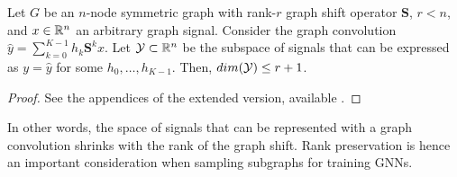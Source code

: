 \begin{proposition}
Let $G$ be an $n$-node symmetric graph with rank-$r$ graph shift operator $\mathbf{S}$, $r < n$, and $x \in {\mathbb R}^n$ an arbitrary graph signal. Consider the graph convolution $\hat{y} = \sum_{k=0}^{K-1}h_k\mathbf{S}^kx$. Let ${\mathcal Y} \subset {\mathbb R}^n$ be the subspace of signals that can be expressed as $y=\hat{y}$ for some $h_0, \ldots, h_{K-1}$. Then, $dim({\mathcal Y}) \leq r + 1$.
\end{proposition}
\begin{proof}
   See the appendices of the extended version, available . 
\end{proof}


In other words, the space of signals that can be represented with a graph convolution shrinks with the rank of the graph shift. Rank preservation is hence an important consideration when sampling subgraphs for training GNNs.